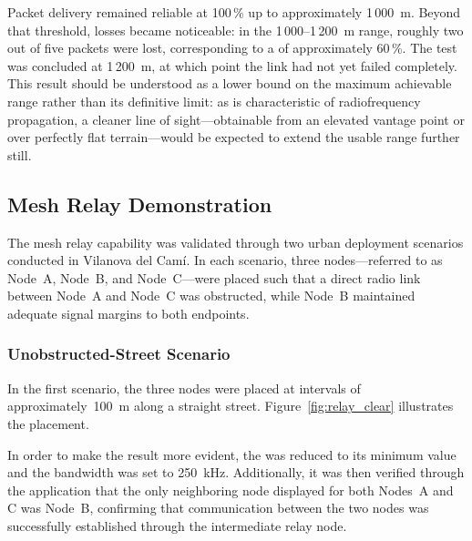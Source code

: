 \documentclass[english,bachelor]{tfgitic}[2026/01/22]
\begin{document}
Packet delivery remained reliable at 100\,\%  up to approximately 1\,000~m. Beyond that threshold, losses became noticeable: in the 1\,000--1\,200~m range, roughly two out of five packets were lost, corresponding to a  of approximately 60\,\%. The test was concluded at 1\,200~m, at which point the link had not yet failed completely. This result should be understood as a lower bound on the maximum achievable range rather than its definitive limit: as is characteristic of radiofrequency propagation, a cleaner line of sight---obtainable from an elevated vantage point or over perfectly flat terrain---would be expected to extend the usable range further still.



\subsection{Mesh Relay Demonstration}
\label{sec:results_relay}

The mesh relay capability was validated through two urban deployment scenarios conducted in Vilanova del Camí. In each scenario, three nodes---referred to as Node~A, Node~B, and Node~C---were placed such that a direct radio link between Node~A and Node~C was obstructed, while Node~B maintained adequate signal margins to both endpoints.

\subsubsection{Unobstructed-Street Scenario}

In the first scenario, the three nodes were placed at intervals of approximately~100~m along a straight street. Figure~\ref{fig:relay_clear} illustrates the placement.




In order to make the result more evident, the  was reduced to its minimum value  and the bandwidth was set to 250~kHz.
Additionally, it was then verified through the application that the only neighboring node displayed for both Nodes~A and C was Node~B, confirming that communication between the two nodes was successfully established through the intermediate relay node.
\end{document}
